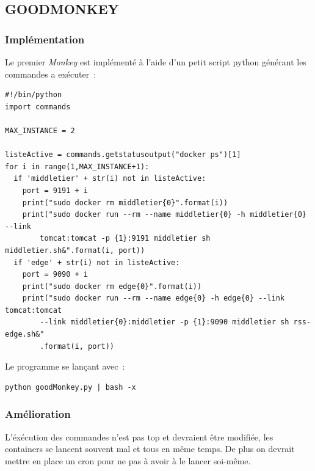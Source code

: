 \documentclass{report}
\begin{document}
	\subsection{GOODMONKEY}
	\subsubsection{Implémentation}
	Le premier \emph{Monkey} est implémenté à l'aide d'un petit script python générant les commandes a exécuter~:
	\begin{verbatim}
#!/bin/python
import commands

MAX_INSTANCE = 2

listeActive = commands.getstatusoutput("docker ps")[1]
for i in range(1,MAX_INSTANCE+1):
  if 'middletier' + str(i) not in listeActive:
    port = 9191 + i
    print("sudo docker rm middletier{0}".format(i))
    print("sudo docker run --rm --name middletier{0} -h middletier{0} --link
		tomcat:tomcat -p {1}:9191 middletier sh middletier.sh&".format(i, port))
  if 'edge' + str(i) not in listeActive:
    port = 9090 + i
    print("sudo docker rm edge{0}".format(i))
    print("sudo docker run --rm --name edge{0} -h edge{0} --link tomcat:tomcat
		--link middletier{0}:middletier -p {1}:9090 middletier sh rss-edge.sh&"
		.format(i, port))
	\end{verbatim}
	Le programme se lançant avec~:
	\begin{verbatim}
python goodMonkey.py | bash -x
	\end{verbatim}
	\subsubsection{Amélioration}
	L'éxécution des commandes n'est pas top et devraient être modifiée, les containers se lancent souvent mal et tous en même temps. De plus on devrait mettre en place un cron pour ne pas à avoir à le lancer soi-même.
\end{document}
